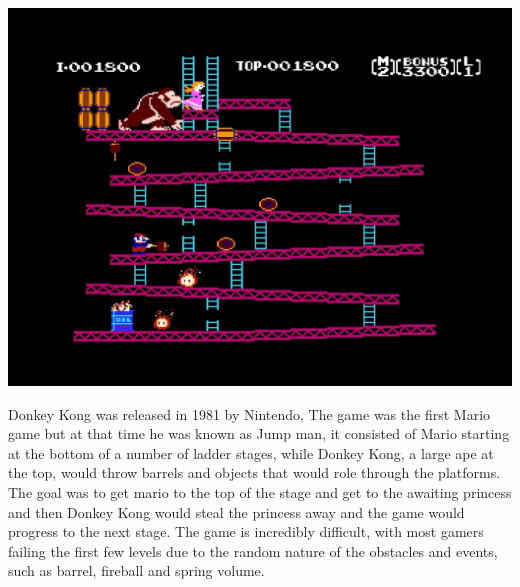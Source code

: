\documentclass{article}
\begin{document}
\begin{minipage}{0.4\textwidth}
\includegraphics[width=\linewidth]{donkeykong}
\end{minipage} \hfill
\begin{minipage}{0.55\textwidth}\raggedright
Donkey Kong was released in 1981 by Nintendo, The game was the first Mario game but at that time he was known as Jump man, it consisted of Mario starting at the bottom of a number of ladder stages, while Donkey Kong, a large ape at the top, would throw barrels and objects that would role through the platforms. The goal was to get mario to the top of the stage and get to the awaiting princess and then Donkey Kong would steal the princess away and the game would progress to the next stage. The game is incredibly difficult, with most gamers failing the first few levels due to the random nature of the obstacles and events, such as barrel, fireball and spring volume.
\end{minipage} \newline
\end{document}
